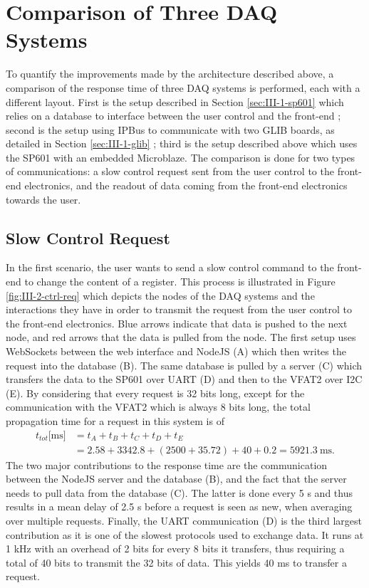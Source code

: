   \section{Comparison of Three DAQ Systems}

    To quantify the improvements made by the architecture described above, a comparison of the response time of three DAQ systems is performed, each with a different layout. First is the setup described in Section \ref{sec:III-1-sp601} which relies on a database to interface between the user control and the front-end ; second is the setup using IPBus to communicate with two GLIB boards, as detailed in Section \ref{sec:III-1-glib} ; third is the setup described above which uses the SP601 with an embedded Microblaze. The comparison is done for two types of communications: a slow control request sent from the user control to the front-end electronics, and the readout of data coming from the front-end electronics towards the user.

    \subsection{Slow Control Request}

      In the first scenario, the user wants to send a slow control command to the front-end to change the content of a register. This process is illustrated in Figure \ref{fig:III-2-ctrl-req} which depicts the nodes of the DAQ systems and the interactions they have in order to transmit the request from the user control to the front-end electronics. Blue arrows indicate that data is pushed to the next node, and red arrows that the data is pulled from the node. The first setup uses WebSockets between the web interface and NodeJS (A) which then writes the request into the database (B). The same database is pulled by a server (C) which transfers the data to the SP601 over UART (D) and then to the VFAT2 over I2C (E). By considering that every request is 32 bits long, except for the communication with the VFAT2 which is always 8 bits long, the total propagation time for a request in this system is of
      \begin{equation}
        \begin{split}
          t_{tot}\text{[ms]} & = t_A + t_B + t_C + t_D + t_E \\
                             & = 2.58 + 3342.8 + (2500 + 35.72) + 40 + 0.2 = 5921.3 \ \text{ms}.
        \end{split}
      \end{equation}
      The two major contributions to the response time are the communication between the NodeJS server and the database (B), and the fact that the server needs to pull data from the database (C). The latter is done every 5 s and thus results in a mean delay of 2.5 s before a request is seen as new, when averaging over multiple requests. Finally, the UART communication (D) is the third largest contribution as it is one of the slowest protocols used to exchange data. It runs at 1 kHz with an overhead of 2 bits for every 8 bits it transfers, thus requiring a total of 40 bits to transmit the 32 bits of data. This yields 40 ms to transfer a request. \\

